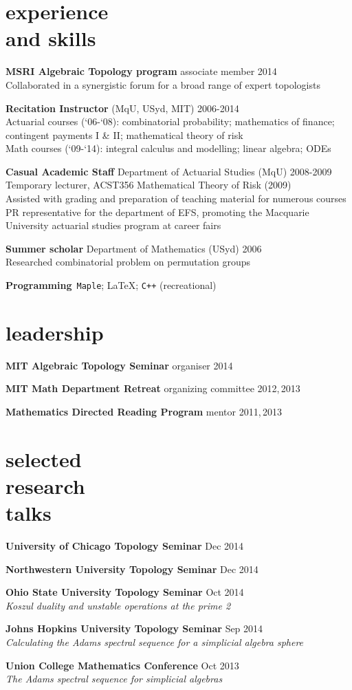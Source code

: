 \documentclass[margin,line]{resume}
\newcommand{\dashtab}{\makebox[1cm][r]{$-$ }}
\newcommand{\whitetab}{\makebox[1cm][r]{ }}
\newcommand{\CVsection}[1]{\section{\mysidestyle #1}}
\newcommand{\entry}[3]{\textbf{#1} #2 \hfill {#3}
           
\vspace{-3.4mm}}
\newcommand{\twolineentry}[4]{\textbf{#1} #2 \hfill {#4}\\%
#3
           
\vspace{-3.4mm}}
\newcommand{\FINALentry}[3]{\textbf{#1} #2 \hfill {#3}\\\vspace{-.55cm}}
\newcommand{\FINALtwolineentry}[4]{\textbf{#1} #2 \hfill {#4}\\%
#3\\\vspace{-.55cm}}
\begin{document}
\begin{resume}
\CVsection{experience\\and skills}
\twolineentry{MSRI Algebraic Topology program}{associate member}{\dashtab Collaborated in a synergistic forum for a broad range of expert topologists}{2014}
\twolineentry{Recitation Instructor}{(MqU, USyd, MIT)}{
\dashtab Actuarial courses (`06-`08): combinatorial probability; mathematics of finance;\\
\whitetab contingent payments I \& II; mathematical theory of risk \\
\dashtab Math courses (`09-`14): integral calculus and modelling; linear algebra; ODEs
}{2006-2014}
\twolineentry{Casual Academic Staff}{Department of Actuarial Studies (MqU)}{%
\dashtab Temporary lecturer, ACST356 Mathematical Theory of Risk (2009)\\
\dashtab Assisted with grading and preparation of teaching material for numerous courses\\
\dashtab PR representative for the department of EFS, promoting the Macquarie\\\whitetab University actuarial studies program at career fairs%
}{2008-2009}
\twolineentry{Summer scholar}{Department of Mathematics (USyd)}{%
\dashtab Researched combinatorial problem on permutation groups
}{2006}
\FINALentry{Programming}{\,\texttt{Maple}; \LaTeX; \texttt{C++} (recreational)}{}

\CVsection{leadership}
\entry{MIT Algebraic Topology Seminar}{organiser}{2014}
\entry{MIT Math Department Retreat}{organizing committee}{2012,\,2013}
\FINALentry{Mathematics Directed Reading Program}{mentor}{2011,\,2013}

\CVsection{selected\\research\\talks}
\entry{University of Chicago Topology Seminar}{}{Dec 2014}%
\entry{Northwestern University Topology Seminar}{}{Dec 2014}%
\twolineentry{Ohio State University Topology Seminar}{}{\whitetab \emph{Koszul duality and unstable operations at the prime 2}}{Oct 2014}%
\twolineentry{Johns Hopkins University Topology Seminar}{}{\whitetab \emph{Calculating the Adams spectral sequence for a simplicial algebra sphere}}{Sep 2014}%
\FINALtwolineentry{Union College Mathematics Conference}{}{\whitetab \emph{The Adams spectral sequence for simplicial algebras}}{Oct 2013}%


\end{resume}
\end{document}
